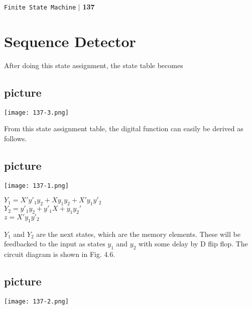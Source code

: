 \documentclass[9pt]{beamer}
\begin{document}
\begin{frame}

\begin{flushright}
\texttt{Finite State Machine} \hspace*{0.10cm}\textbf{$|$} \textbf{137}\hspace*{0.5cm}
\end{flushright}

\section*{Sequence Detector}

\vspace*{1cm}
After doing this state assignment, the state table becomes
\begin{center}
\section{picture}
\texttt{[image: 137-3.png]}
\end{center}
\end{frame}

\begin{frame}
From this state assignment table, the digital function can easily be derived as follows.
\begin{center}
\section{picture}
\texttt{[image: 137-1.png]}
\end{center}

\begin{center}
$Y_1 = X'y'_1y_2 + Xy_1y_2 + X'y_1y'_2$\\
$Y_2 = y'_1y_2 + y'_1X + y_1y_2'$\\
$z = X'y_1y'_2$\\
\end{center}
\end{frame}

\begin{frame}
\hspace*{0.2cm} $Y_1$ and $Y_2$ are the next states, which are the memory elements. These will be feedbacked to the input
as states $y_1$ and $y_2$ with some delay by D flip flop. The circuit diagram is shown in Fig. 4.6.

\pause
\begin{center}
\section{picture}
\texttt{[image: 137-2.png]}
\end{center}
\end{frame}
\end{document}
